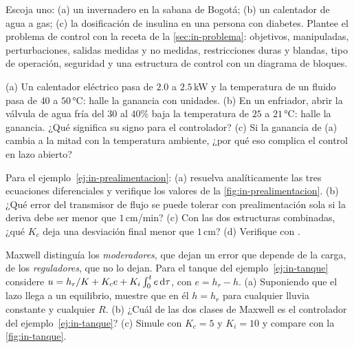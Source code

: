 \begin{problema}\label{prob:in-plantear}
Escoja uno: (a) un invernadero en la sabana de Bogotá; (b) un calentador de agua a gas; (c) la dosificación de insulina en una persona con diabetes. Plantee el problema de control con la receta de la \cref{sec:in-problema}: objetivos, manipuladas, perturbaciones, salidas medidas y no medidas, restricciones duras y blandas, tipo de operación, seguridad y una estructura de control con un diagrama de bloques.
\end{problema}

\begin{problema}\label{prob:in-ganancia}
(a) Un calentador eléctrico pasa de $2.0$ a $2.5$\,kW y la temperatura de un fluido pasa de $40$ a $50$\,°C: halle la ganancia con unidades. (b) En un enfriador, abrir la válvula de agua fría del $30$ al $40\%$ baja la temperatura de $25$ a $21$\,°C: halle la ganancia. ¿Qué significa su signo para el controlador? (c) Si la ganancia de (a) cambia a la mitad con la temperatura ambiente, ¿por qué eso complica el control en lazo abierto?
\end{problema}

\begin{problema}[prealimentación]\label{prob:in-prealimentacion}
\etiquetaM{} Para el ejemplo~\ref{ej:in-prealimentacion}: (a) resuelva analíticamente las tres ecuaciones diferenciales y verifique los valores de la \cref{fig:in-prealimentacion}. (b) ¿Qué error del transmisor de flujo se puede tolerar con prealimentación sola si la deriva debe ser menor que $1$\,cm/min? (c) Con las dos estructuras combinadas, ¿qué $K_c$ deja una desviación final menor que $1$\,cm? (d) Verifique con .
\end{problema}

\begin{problema}\label{prob:in-maxwell}
\etiquetaEstrella{} Maxwell distinguía los \emph{moderadores}, que dejan un error que depende de la carga, de los \emph{reguladores}, que no lo dejan. Para el tanque del ejemplo~\ref{ej:in-tanque} considere $u=h_r/K+K_ce+K_i\int_0^te\,\mathrm{d}\tau$, con $e=h_r-h$. (a) Suponiendo que el lazo llega a un equilibrio, muestre que en él $h=h_r$ para cualquier lluvia constante y cualquier $R$. (b) ¿Cuál de las dos clases de Maxwell es el controlador del ejemplo~\ref{ej:in-tanque}? (c) \etiquetaM{} Simule con $K_c=5$ y $K_i=10$ y compare con la \cref{fig:in-tanque}.
\end{problema}

